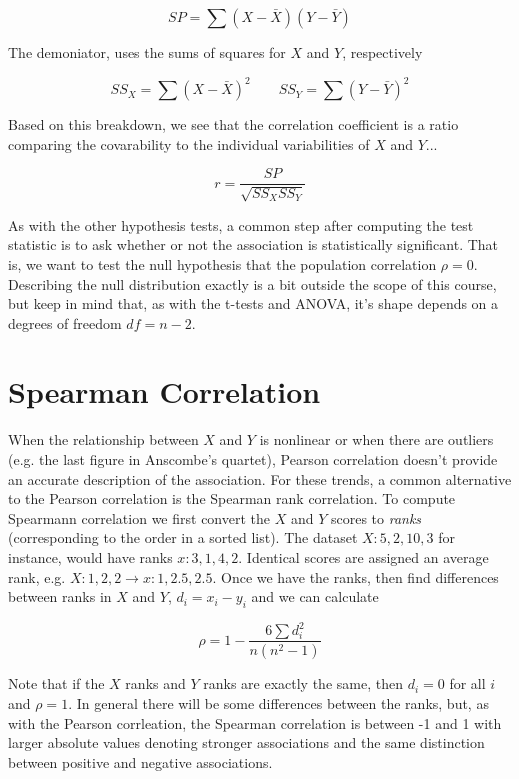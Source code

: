 \documentclass{tufte-handout}
\begin{document}
\begin{equation*}
SP=\sum (X-\bar{X})(Y-\bar{Y})
\end{equation*}

The demoniator, uses the sums of squares for $X$ and $Y$, respectively

\begin{equation*}
SS_X=\sum (X-\bar{X})^2 \qquad SS_Y=\sum (Y-\bar{Y})^2
\end{equation*}

Based on this breakdown, we see that the correlation coefficient is a ratio comparing the covarability to the individual variabilities of $X$ and $Y$...

\begin{equation*}
r=\frac{SP}{\sqrt{SS_X SS_Y}}
\end{equation*}

As with the other hypothesis tests, a common step after computing the test statistic is to ask whether or not the association is statistically significant. That is, we want to test the null hypothesis that the population correlation $\rho=0$. Describing the null distribution exactly is a bit outside the scope of this course, but keep in mind that, as with the t-tests and ANOVA, it's shape depends on a degrees of freedom $df=n-2$.

\section{Spearman Correlation}
When the relationship between $X$ and $Y$ is nonlinear or when there are outliers (e.g. the last figure in Anscombe's quartet), Pearson correlation doesn't provide an accurate description of the association. For these trends, a common alternative to the Pearson correlation is the Spearman rank correlation. To compute Spearmann correlation we first convert the $X$ and $Y$ scores to \emph{ranks} (corresponding to the order in a sorted list). The dataset $X:{5,2,10,3}$ for instance, would have ranks $x:{3,1,4,2}$. Identical scores are assigned an average rank, e.g. $X:{1,2,2}\to x:{1,2.5,2.5}$. Once we have the ranks, then find differences between ranks in $X$ and $Y$, $d_i=x_i-y_i$ and we can calculate

\begin{equation*}
\rho=1-\frac{6\sum d_i^2}{n(n^2-1)}
\end{equation*}

Note that if the $X$ ranks and $Y$ ranks are exactly the same, then $d_i=0$ for all $i$ and $\rho=1$. In general there will be some differences between the ranks, but, as with the Pearson corrleation, the Spearman correlation is between -1 and 1 with larger absolute values denoting stronger associations and the same distinction between positive and negative associations.
\end{document}
